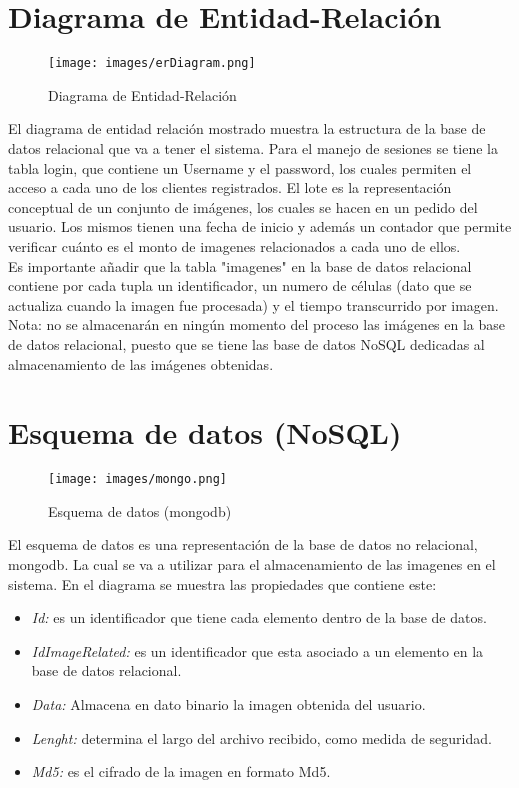 \documentclass{scrreprt}
\begin{document}
\section{Diagrama de Entidad-Relación}
\begin{figure}[H]
	\centering
    \texttt{[image: images/erDiagram.png]}
    \caption{Diagrama de Entidad-Relación}
\end{figure}
El diagrama de entidad relación mostrado muestra la estructura de la base de datos relacional que va a tener el sistema. 
Para el manejo de sesiones se tiene la tabla login, que contiene un Username y el password, los cuales permiten el acceso a cada uno de los clientes registrados.
El lote es la representación conceptual de un conjunto de imágenes, los cuales se hacen en un pedido del usuario. Los mismos tienen una fecha de inicio y además un contador que permite verificar cuánto es el monto de imagenes relacionados a cada uno de ellos.\\

Es importante añadir que la tabla "imagenes" en la base de datos relacional contiene por cada tupla un identificador, un numero de células (dato que se actualiza cuando la imagen fue procesada) y el tiempo transcurrido por imagen. \\

Nota: no se almacenarán en ningún momento del proceso las imágenes en la base de datos relacional, puesto que se tiene las base de datos NoSQL dedicadas al almacenamiento de las imágenes obtenidas.

\section{Esquema de datos (NoSQL)}

\begin{figure}[H]
	\centering
    \texttt{[image: images/mongo.png]}
    \caption{Esquema de datos (mongodb)}
\end{figure}

El esquema de datos es una representación de la base de datos no relacional, mongodb. La cual se va a utilizar para el almacenamiento de las imagenes en el sistema. En el diagrama se muestra las propiedades que contiene este:

\begin{itemize}
	\item \textit{Id:} es un identificador que tiene cada elemento dentro de la base de datos.
    \item \textit{IdImageRelated:} es un identificador que esta asociado a un elemento en la base de datos relacional.
    \item \textit{Data:} Almacena en dato binario la imagen obtenida del usuario.
    \item \textit{Lenght:} determina el largo del archivo recibido, como medida de seguridad.
    \item \textit{Md5:} es el cifrado de la imagen en formato Md5.
    
\end{itemize}
\end{document}

